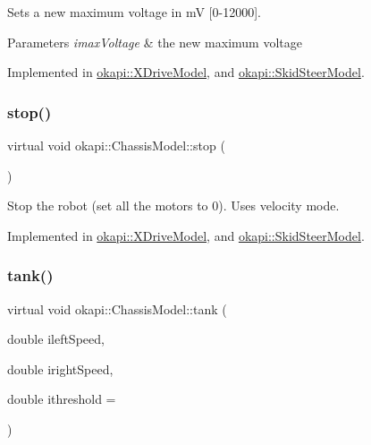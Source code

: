 Sets a new maximum voltage in mV \mbox{[}0-\/12000\mbox{]}.


\begin{DoxyParams}{Parameters}
{\em imax\+Voltage} & the new maximum voltage \\
\hline
\end{DoxyParams}


Implemented in \mbox{\hyperlink{classokapi_1_1XDriveModel_a6d001a2147ecb642f60cd21ac73c64ea}{okapi\+::\+X\+Drive\+Model}}, and \mbox{\hyperlink{classokapi_1_1SkidSteerModel_ad4dc0f8e3877b23ffb8ae58903bdffb7}{okapi\+::\+Skid\+Steer\+Model}}.

\mbox{\label{classokapi_1_1ChassisModel_ad67ad9abae41c5441c2a2d671d0c8a55}} 
\subsubsection{\texorpdfstring{stop()}{stop()}}
{\footnotesize\ttfamily virtual void okapi\+::\+Chassis\+Model\+::stop (\begin{DoxyParamCaption}{ }\end{DoxyParamCaption})\hspace{0.3cm}{\ttfamily [pure virtual]}}

Stop the robot (set all the motors to 0). Uses velocity mode. 

Implemented in \mbox{\hyperlink{classokapi_1_1XDriveModel_a2fe09b755e8a6f321d6365cedc774e04}{okapi\+::\+X\+Drive\+Model}}, and \mbox{\hyperlink{classokapi_1_1SkidSteerModel_a98d212cff8bad647ada6bcd3054c7581}{okapi\+::\+Skid\+Steer\+Model}}.

\mbox{\label{classokapi_1_1ChassisModel_a185a667048f84c3a0fced6882c5f7980}} 
\subsubsection{\texorpdfstring{tank()}{tank()}}
{\footnotesize\ttfamily virtual void okapi\+::\+Chassis\+Model\+::tank (\begin{DoxyParamCaption}\item[{double}]{ileft\+Speed,  }\item[{double}]{iright\+Speed,  }\item[{double}]{ithreshold = {} }\end{DoxyParamCaption})\hspace{0.3cm}{\ttfamily [pure virtual]}}

